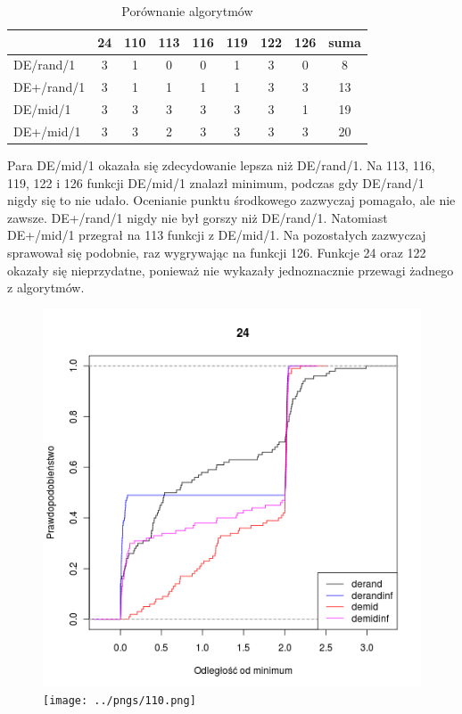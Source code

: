 \documentclass[12pt, a4paper]{article}
\begin{document}
\begin{table}
\centering
\begin{tabular}{ l | c | c | c | c | c | c | c | c}
              & 24 & 110 & 113 & 116 & 119 & 122 & 126 & suma \\ \hline
DE/rand/1     & 3  & 1   & 0   & 0   & 1   & 3   & 0   & 8    \\ 
DE+/rand/1    & 3  & 1   & 1   & 1   & 1   & 3   & 3   & 13   \\ 
DE/mid/1      & 3  & 3   & 3   & 3   & 3   & 3   & 1   & 19   \\ 
DE+/mid/1     & 3  & 3   & 2   & 3   & 3   & 3   & 3   & 20   \\
\end{tabular}
\caption{Porównanie algorytmów}
\label{table:compare}
\end{table}

Para DE/mid/1 okazała się zdecydowanie lepsza niż DE/rand/1. Na 113, 116, 119, 122 i 126 funkcji DE/mid/1
znalazł minimum, podczas gdy DE/rand/1 nigdy się to nie udało. Ocenianie punktu środkowego zazwyczaj pomagało,
ale nie zawsze. DE+/rand/1 nigdy nie był gorszy niż DE/rand/1. Natomiast DE+/mid/1 przegrał
na 113 funkcji z DE/mid/1. Na pozostałych zazwyczaj sprawował się podobnie, raz wygrywając na funkcji 126.
Funkcje 24 oraz 122 okazały się nieprzydatne, ponieważ nie wykazały jednoznacznie przewagi żadnego z algorytmów. \\ 


\begin{figure}
\centering
\includegraphics[scale=0.75]{../pngs/24.png} 
\texttt{[image: ../pngs/110.png]}
\end{figure}
\end{document}
